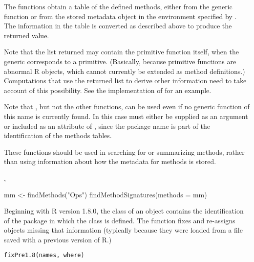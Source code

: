 \begin{Details}\relax

The functions obtain a table of the defined methods, either from the
generic function or from the stored metadata object in the environment
specified by .  The information in the table is converted
as described above to produce the returned value.

Note that the list returned may contain the primitive function itself,
when the generic corresponds to a primitive.  (Basically, because
primitive functions are abnormal R objects, which cannot currently be
extended as method definitions.)  Computations that use the returned
list to derive other information need to take account of this
possibility.  See the implementation of 
for an example.

Note that , but not the other functions, can be used
even if no generic function of this name is currently found.  In this
case  must either be supplied as an argument or included
as an attribute of , since the package name is part of the
identification of the methods tables.

These functions should be used in searching for or summarizing
methods, rather than using information about how the metadata for
methods is stored.
\end{Details}
%
\begin{SeeAlso}\relax
 ,  
\end{SeeAlso}
%
\begin{Examples}
\begin{ExampleCode}
mm <-  findMethods("Ops")
findMethodSignatures(methods = mm)
\end{ExampleCode}
\end{Examples}
%
\begin{Description}\relax
Beginning with R version 1.8.0, the class of an object contains the
identification of the package in which the class is defined.  The
function  fixes and re-assigns objects missing that information
(typically because they were loaded from a file saved with a previous
version of R.)
\end{Description}
%
\begin{Usage}
\begin{verbatim}
fixPre1.8(names, where)
\end{verbatim}
\end{Usage}
